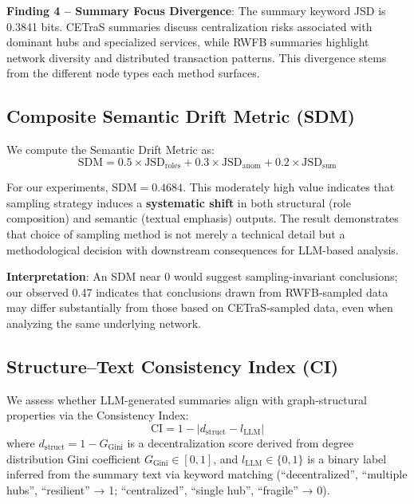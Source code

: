 \textbf{Finding 4 -- Summary Focus Divergence}: The summary keyword JSD is 0.3841 bits. CETraS summaries discuss centralization risks associated with dominant hubs and specialized services, while RWFB summaries highlight network diversity and distributed transaction patterns. This divergence stems from the different node types each method surfaces.

\subsection{Composite Semantic Drift Metric (SDM)}

We compute the Semantic Drift Metric as:
\begin{equation}
\text{SDM} = 0.5 \times \text{JSD}_{\text{roles}} + 0.3 \times \text{JSD}_{\text{anom}} + 0.2 \times \text{JSD}_{\text{sum}}
\label{eq:sdm}
\end{equation}

For our experiments, $\text{SDM} = 0.4684$. This moderately high value indicates that sampling strategy induces a \textbf{systematic shift} in both structural (role composition) and semantic (textual emphasis) outputs. The result demonstrates that choice of sampling method is not merely a technical detail but a methodological decision with downstream consequences for LLM-based analysis.

\textbf{Interpretation}: An SDM near 0 would suggest sampling-invariant conclusions; our observed 0.47 indicates that conclusions drawn from RWFB-sampled data may differ substantially from those based on CETraS-sampled data, even when analyzing the same underlying network.

\subsection{Structure--Text Consistency Index (CI)}

We assess whether LLM-generated summaries align with graph-structural properties via the Consistency Index:
\begin{equation}
\text{CI} = 1 - \left| d_{\text{struct}} - l_{\text{LLM}} \right|
\label{eq:ci}
\end{equation}
where $d_{\text{struct}} = 1 - G_{\text{Gini}}$ is a decentralization score derived from degree distribution Gini coefficient $G_{\text{Gini}} \in [0,1]$, and $l_{\text{LLM}} \in \{0,1\}$ is a binary label inferred from the summary text via keyword matching (``decentralized'', ``multiple hubs'', ``resilient'' → 1; ``centralized'', ``single hub'', ``fragile'' → 0).

